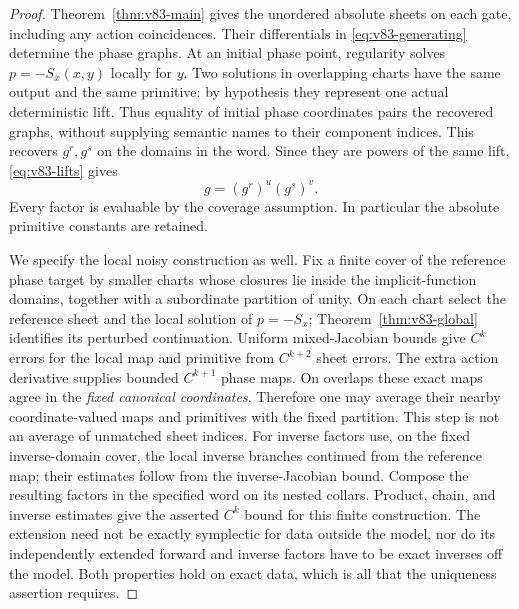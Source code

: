 \begin{proof}
Theorem~\ref{thm:v83-main} gives the unordered absolute sheets on each
gate, including any action coincidences. Their differentials in
\eqref{eq:v83-generating} determine the phase graphs. At an initial
phase point, regularity solves $p=-S_x(x,y)$ locally for $y$.
Two solutions in overlapping charts have the same output and the
same primitive: by hypothesis they represent one actual deterministic
lift. Thus equality of initial phase coordinates pairs the recovered
graphs, without supplying semantic names to their component indices.
This recovers $g^r,g^s$ on the domains in the word. Since they are
powers of the same lift, \eqref{eq:v83-lifts} gives
\[
                         g=(g^r)^u(g^s)^v.
\]
Every factor is evaluable by the coverage assumption. In particular
the absolute primitive constants are retained.

We specify the local noisy construction as well. Fix a finite cover
of the reference phase target by smaller charts whose closures lie
inside the implicit-function domains, together with a subordinate
partition of unity. On each chart select the reference sheet and the
local solution of $p=-S_x$; Theorem~\ref{thm:v83-global} identifies
its perturbed continuation. Uniform mixed-Jacobian bounds give
$C^k$ errors for the local map and primitive from $C^{k+2}$ sheet
errors. The extra action derivative supplies bounded $C^{k+1}$
phase maps. On overlaps these exact maps agree in the \emph{fixed
canonical coordinates}. Therefore one may average their nearby
coordinate-valued maps and primitives with the fixed partition. This
step is not an average of unmatched sheet indices. For inverse factors
use, on the fixed inverse-domain cover, the local inverse branches
continued from the reference map; their estimates follow from the
inverse-Jacobian bound. Compose the resulting factors in the specified
word on its nested collars. Product, chain, and inverse estimates give
the asserted $C^k$ bound for this finite construction. The extension
need not be exactly symplectic for data outside the model, nor do its
independently extended forward and inverse factors have to be exact
inverses off the model. Both properties hold on exact data, which is
all that the uniqueness assertion requires.
\end{proof}

